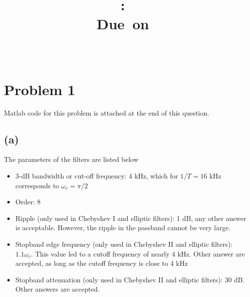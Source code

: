 \documentclass{article}
\title{
\vspace{2in}
\textmd{\textbf{\hmwkClass:\ \hmwkTitle}}\\
\normalsize\vspace{0.1in}\small{Due\ on\ \hmwkDueDate}\\
\vspace{0.1in}\large{\textit{\hmwkClassInstructor\ \hmwkClassTime}}
\vspace{3in}
}
\author{\textbf{\hmwkAuthorName}}
\date{} %
\begin{document}
	
\section{Problem 1}

Matlab code for this problem is attached at the end of this question.

\subsection{(a)}

The parameters of the filters are listed below
\begin{itemize}
	\item 3-dB bandwidth or cut-off frequency: 4 kHz, which for $1/T = 16$ kHz corresponds to $\omega_c = \pi/2$ 
	\item Order: 8
	\item Ripple (only used in Chebyshev I and elliptic filters): 1 dB, any other answer is acceptable. However, the ripple in the passband cannot be very large.
	\item Stopband edge frequency (only used in Chebyshev II and elliptic filters): $1.1\omega_c$. This value led to a cutoff frequency of nearly 4 kHz. Other answer are accepted, as long as the cutoff frequency is close to 4 kHz
	\item Stopband attenuation (only used in Chebyshev II and elliptic filters): 30 dB. Other answers are accepted.
\end{itemize}
\end{document}
